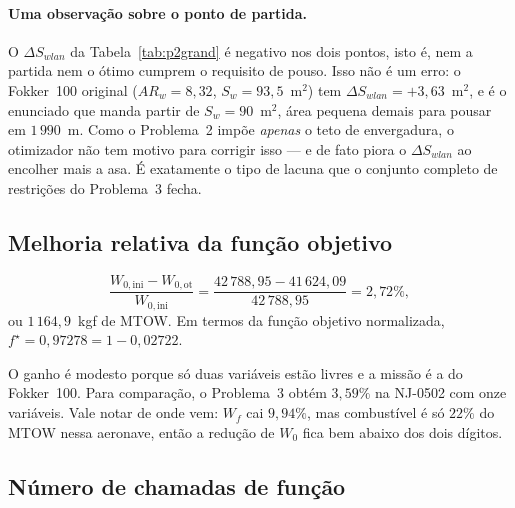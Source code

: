 \paragraph{Uma observação sobre o ponto de partida.}
O $\Delta S_{wlan}$ da Tabela~\ref{tab:p2grand} é negativo nos dois
pontos, isto é, nem a partida nem o ótimo cumprem o requisito de pouso.
Isso não é um erro: o Fokker~100 original ($AR_w = 8{,}32$,
$S_w = 93{,}5$~m$^2$) tem $\Delta S_{wlan} = +3{,}63$~m$^2$, e é o
enunciado que manda partir de $S_w = 90$~m$^2$, área pequena demais para
pousar em $1\,990$~m. Como o Problema~2 impõe \emph{apenas} o teto de
envergadura, o otimizador não tem motivo para corrigir isso --- e de fato
piora o $\Delta S_{wlan}$ ao encolher mais a asa. É exatamente o tipo de
lacuna que o conjunto completo de restrições do Problema~3 fecha.

\subsection{Melhoria relativa da função objetivo}
\label{sec:p2q2}

\begin{equation}
\frac{W_{0,\mathrm{ini}} - W_{0,\mathrm{ot}}}{W_{0,\mathrm{ini}}}
= \frac{42\,788{,}95 - 41\,624{,}09}{42\,788{,}95}
= 2{,}72\% ,
\label{eq:p2ganho}
\end{equation}
ou $1\,164{,}9$~kgf de MTOW. Em termos da função objetivo normalizada,
$f^\star = 0{,}97278 = 1 - 0{,}02722$.

O ganho é modesto porque só duas variáveis estão livres e a missão é a
do Fokker~100. Para comparação, o Problema~3 obtém $3{,}59\%$ na NJ-0502
com onze variáveis. Vale notar de onde vem: $W_f$ cai $9{,}94\%$, mas
combustível é só $22\%$ do MTOW nessa aeronave, então a redução de
$W_0$ fica bem abaixo dos dois dígitos.

\subsection{Número de chamadas de função}
\label{sec:p2q3}

\begin{table}[H]
\centering
\caption{Contadores da corrida do SLSQP na aeronave padrão.}
\label{tab:p2corrida}
\small

\end{table}

